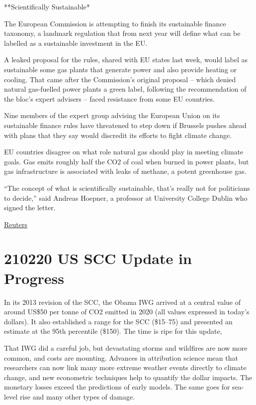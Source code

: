 \documentclass[
]{book}
\begin{document}
**Scientifically Sustainable*

The European Commission is attempting to finish its sustainable finance taxonomy, a landmark regulation that from next year will define what can be labelled as a sustainable investment in the EU.

A leaked proposal for the rules, shared with EU states last week, would label as sustainable some gas plants that generate power and also provide heating or cooling. That came after the Commission's original proposal -- which denied natural gas-fuelled power plants a green label, following the recommendation of the bloc's expert advisers -- faced resistance from some EU countries.

Nine members of the expert group advising the European Union on its sustainable finance rules have threatened to step down if Brussels pushes ahead with plans that they say would discredit its efforts to fight climate change.

EU countries disagree on what role natural gas should play in meeting climate goals. Gas emits roughly half the CO2 of coal when burned in power plants, but gas infrastructure is associated with leaks of methane, a potent greenhouse gas.

``The concept of what is scientifically sustainable, that's really not for politicians to decide,'' said Andreas Hoepner, a professor at University College Dublin who signed the letter.

\href{https://www.reuters.com/article/europe-regulations-finance/nine-eu-advisers-threaten-walkout-over-sustainable-finance-row-idUSL4N2LT4LJ}{Reuters}

\hypertarget{us-scc-update-in-progress}{%
\section{210220 US SCC Update in Progress}\label{us-scc-update-in-progress}}

In its 2013 revision of the SCC, the Obama IWG arrived at a central value of around US\$50 per tonne of CO2 emitted in 2020 (all values expressed in today's dollars). It also established a range for the SCC (\$15--75) and presented an estimate at the 95th percentile (\$150).
The time is ripe for this update,

That IWG did a careful job, but devastating storms and wildfires are now more common, and costs are mounting. Advances in attribution science mean that researchers can now link many more extreme weather events directly to climate change, and new econometric techniques help to quantify the dollar impacts. The monetary losses exceed the predictions of early models. The same goes for sea-level rise and many other types of damage.
\end{document}
